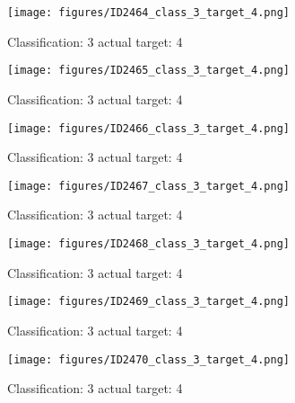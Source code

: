 \begin{figure}[h!]
\begin{center}
\texttt{[image: figures/ID2464\_class\_3\_target\_4.png]}
\end{center}
\caption{ Classification: 3 actual target: 4}
\label{fig:ID2464_class_3_target_4}
\end{figure}
\begin{figure}[h!]
\begin{center}
\texttt{[image: figures/ID2465\_class\_3\_target\_4.png]}
\end{center}
\caption{ Classification: 3 actual target: 4}
\label{fig:ID2465_class_3_target_4}
\end{figure}
\begin{figure}[h!]
\begin{center}
\texttt{[image: figures/ID2466\_class\_3\_target\_4.png]}
\end{center}
\caption{ Classification: 3 actual target: 4}
\label{fig:ID2466_class_3_target_4}
\end{figure}
\begin{figure}[h!]
\begin{center}
\texttt{[image: figures/ID2467\_class\_3\_target\_4.png]}
\end{center}
\caption{ Classification: 3 actual target: 4}
\label{fig:ID2467_class_3_target_4}
\end{figure}
\begin{figure}[h!]
\begin{center}
\texttt{[image: figures/ID2468\_class\_3\_target\_4.png]}
\end{center}
\caption{ Classification: 3 actual target: 4}
\label{fig:ID2468_class_3_target_4}
\end{figure}
\begin{figure}[h!]
\begin{center}
\texttt{[image: figures/ID2469\_class\_3\_target\_4.png]}
\end{center}
\caption{ Classification: 3 actual target: 4}
\label{fig:ID2469_class_3_target_4}
\end{figure}
\begin{figure}[h!]
\begin{center}
\texttt{[image: figures/ID2470\_class\_3\_target\_4.png]}
\end{center}
\caption{ Classification: 3 actual target: 4}
\label{fig:ID2470_class_3_target_4}
\end{figure}
